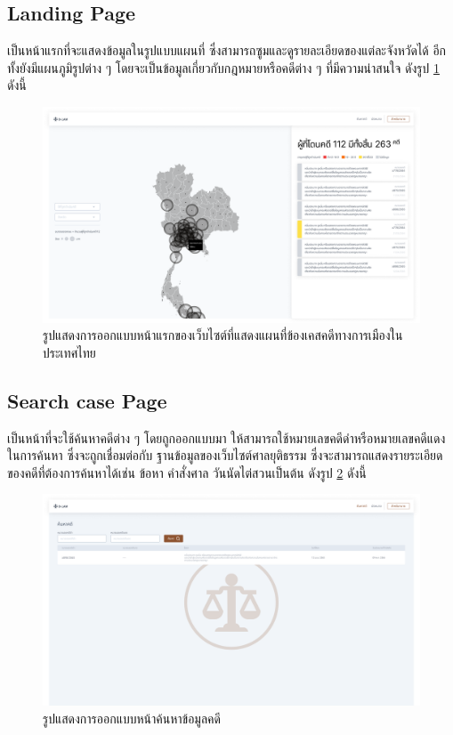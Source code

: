 \documentclass[12pt,oneside,openright,a4paper]{cpe-thai-project}
\begin{document}
\begin{itemize}
\end{itemize}
\newpage

\subsection{Landing Page}
\hspace*{1cm} เป็นหน้าแรกที่จะแสดงข้อมูลในรูปแบบแผนที่ ซึ่งสามารถซูมและดูรายละเอียดของแต่ละจังหวัดได้ อีกทั้งยังมีแผนภูมิรูปต่าง ๆ โดยจะเป็นข้อมูลเกี่ยวกับกฎหมายหรือคดีต่าง ๆ ที่มีความน่าสนใจ ดังรูป \ref{fig:landing-page} ดังนี้
\begin{figure}[!h]\centering
  \includegraphics[width=16cm]{./assets/userinterface/landing-page.png}
  \caption{รูปแสดงการออกแบบหน้าแรกของเว็บไซต์ที่แสดงแผนที่ข้องเคสคดีทางการเมืองในประเทศไทย}\label{fig:landing-page}
\end{figure}

\subsection{Search case Page}
\hspace*{1cm} เป็นหน้าที่จะใช้ค้นหาคดีต่าง ๆ โดยถูกออกแบบมา ให้สามารถใช้หมายเลขคดีดำหรือหมายเลขคดีแดงในการค้นหา ซึ่งจะถูกเชื่อมต่อกับ ฐานข้อมูลของเว็บไซต์ศาลยุติธรรม ซึ่งจะสามารถแสดงรายระเอียดของคดีที่ต้องการค้นหาได้เช่น ข้อหา คำสั่งศาล วันนัดไต่สวนเป็นต้น ดังรูป \ref{fig:search-case} ดังนี้ 
\begin{figure}[!h]\centering
  \includegraphics[width=16cm]{./assets/userinterface/search-case.png}
  \caption{รูปแสดงการออกแบบหน้าค้นหาข้อมูลคดี}\label{fig:search-case}
\end{figure}
\end{document}
